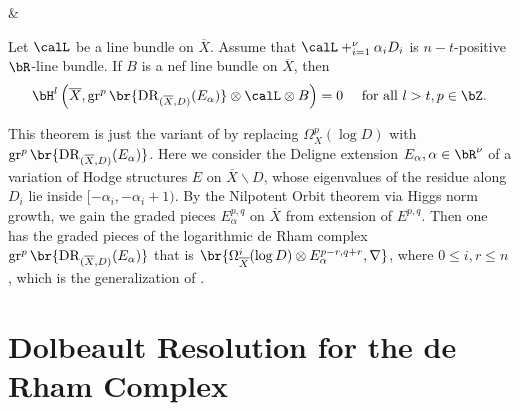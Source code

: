 \documentclass[lang=en,12pt]{beautybook}
\begin{document}
\begin{center}
\begin{tblr}
                                                                     &                                                                                                                                                                                                                                                                                                                                                                                                                                                                                                                                                                 \\
  \end{tblr}\end{center}

\begin{theorem}
  Let $\calL$ be a line bundle on $\overline{X}$. Assume that $\calL + \sum_{i=1}^{\nu} \alpha_{i} D_{i}$ is $n-t$-positive $\bR$-line bundle. If $B$ is a nef line bundle on $\overline{X}$, then
  $$ \bH^{l}\left( \overline{X} , \operatorname{gr}^{p} \br{\operatorname{DR}_{(\overline{X}, D)}(E_{\alpha}) } \otimes \calL \otimes B \right) = 0 \quad \textnormal{ for all } l > t, p \in \bZ.$$
\end{theorem}

\begin{remark}
  This theorem is just the variant of \cite[Theorem 1.1 (4.1)]{huang2016logarithmic} by replacing $\Omega_X^p(\log D)$ with $\operatorname{gr}^{p} \br{\operatorname{DR}_{(\overline{X}, D)}(E_{\alpha}) }$. Here we consider the Deligne extension $E_\alpha, \alpha\in \bR^\nu$ of a variation of Hodge structures $E$ on $\overline{X}\backslash D$, whose eigenvalues of the residue along $D_i$ lie inside $[-\alpha_i,-\alpha_i+1)$. By the Nilpotent Orbit theorem via Higgs norm growth, we gain the graded pieces $E_\alpha^{p,q}$ on $\overline{X}$ from extension of $E^{p,q}$. Then one has the graded pieces of the logarithmic de Rham complex $\operatorname{gr}^{p} \br{\operatorname{DR}_{(\overline{X}, D)}(E_{\alpha}) }$ that is $\br{\Omega_{\overline{X}}^i (\log D)\otimes E^{p-r,q+r}_\alpha,\nabla}$, where $0\leq i,r\leq n$, which is the generalization of \cite[Theorem 3.1]{huang2016logarithmic}.
\end{remark}
\clearpage
\section{Dolbeault Resolution for the de Rham Complex}
\end{document}
